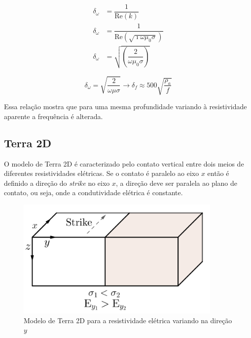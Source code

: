 	\begin{align*}
	 \delta_\omega & = \dfrac{1}{\textrm{Re}(k)} \\
	  \delta_\omega & = \dfrac{1}{\textrm{Re} \left (\sqrt{\imath \omega \mu_0 \sigma} \right)}  \\
	  \delta_\omega & = \sqrt{ \left (\dfrac{2}{\omega \mu_0 \sigma} \right )}
	\end{align*}

	
	\begin{equation}
	 \label{rela_prof_periodo}
	 \delta_\omega = \sqrt{\frac{2}{\omega \mu \sigma}} \longrightarrow \delta_f \approx 500  \sqrt{\frac{\rho_a}{f}}
	\end{equation}
	
	Essa relação mostra que para uma mesma profundidade variando à resistividade
	aparente a frequência é alterada.
        
   
        \subsection{Terra 2D}
        
        O modelo de Terra 2D é caracterizado pelo contato vertical entre dois meios de diferentes resistividades elétricas. Se o contato é
	    paralelo ao eixo $x$ então é definido a direção do \textit{strike} no eixo $x$, a direção deve ser paralela ao plano de contato,
	    ou seja, onde a condutividade elétrica é constante.
	    
	    
	    
	    \begin{figure}[H]
	        \caption{Modelo de Terra 2D para a resistividade elétrica variando na direção $y$}
	        \begin{center}
	        \includegraphics[width=10cm]{texto/fig/Tm_Te.png} 
	        \end{center}
		\label{fig_strike}
	    \end{figure}
	    
